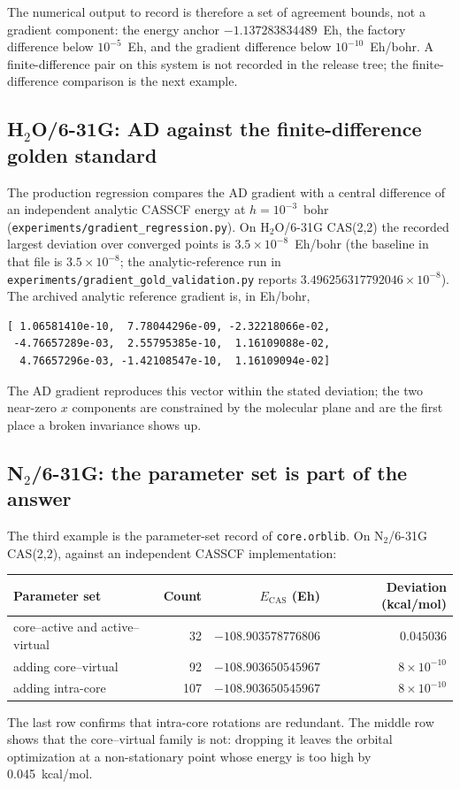 The numerical output to record is therefore a set of agreement
bounds, not a gradient component: the energy anchor
$-1.137283834489$~Eh, the factory difference below $10^{-5}$~Eh, and
the gradient difference below $10^{-10}$~Eh/bohr.  A finite-difference
pair on this system is not recorded in the release tree; the
finite-difference comparison is the next example.

\subsection{H\texorpdfstring{$_2$}{2}O/6-31G: AD against the
finite-difference golden standard}

The production regression compares the AD gradient with a central
difference of an independent analytic CASSCF energy at $h=10^{-3}$~bohr
(\texttt{experiments/gradient\_regression.py}).  On H$_2$O/6-31G
CAS(2,2) the recorded largest deviation over converged points is
$3.5\times10^{-8}$~Eh/bohr (the baseline in that file is
$3.5\times10^{-8}$; the analytic-reference run in
\texttt{experiments/gradient\_gold\_validation.py} reports
$3.496256317792046\times10^{-8}$).  The archived analytic reference
gradient is, in Eh/bohr,
\begin{lstlisting}
[ 1.06581410e-10,  7.78044296e-09, -2.32218066e-02,
 -4.76657289e-03,  2.55795385e-10,  1.16109088e-02,
  4.76657296e-03, -1.42108547e-10,  1.16109094e-02]
\end{lstlisting}
The AD gradient reproduces this vector within the stated deviation;
the two near-zero $x$ components are constrained by the molecular
plane and are the first place a broken invariance shows up.

\subsection{N\texorpdfstring{$_2$}{2}/6-31G: the parameter set is part
of the answer}

The third example is the parameter-set record of
\texttt{core.orblib}.  On N$_2$/6-31G CAS(2,2), against an independent
CASSCF implementation:
\begin{center}
\small
\begin{tabular}{lrrr}
\toprule
Parameter set & Count & $E_{\mathrm{CAS}}$ (Eh) & Deviation (kcal/mol) \\
\midrule
core--active and active--virtual & 32 & $-108.903578776806$ & $0.045036$ \\
adding core--virtual & 92 & $-108.903650545967$ & $8\times10^{-10}$ \\
adding intra-core & 107 & $-108.903650545967$ & $8\times10^{-10}$ \\
\bottomrule
\end{tabular}
\end{center}
The last row confirms that intra-core rotations are redundant.  The
middle row shows that the core--virtual family is not: dropping it
leaves the orbital optimization at a non-stationary point whose energy
is too high by 0.045~kcal/mol.

